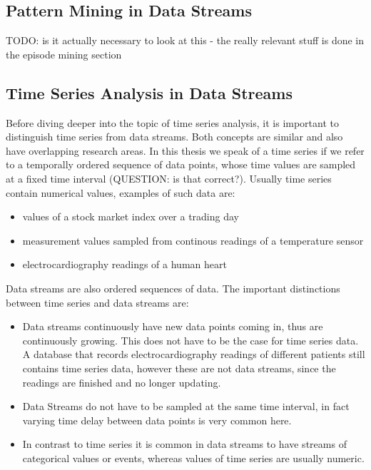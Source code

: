 \subsection{Pattern Mining in Data Streams}
\label{subsec_PatternMining}

TODO: is it actually necessary to look at this - the really relevant stuff is done in the episode mining section

\subsection{Time Series Analysis in Data Streams}
\label{subsec_timeSeriesAnalysis}
Before diving deeper into the topic of time series analysis, it is important to distinguish time series from data streams. Both concepts are similar and also have overlapping research areas. In this thesis we speak of a time series if we refer to a temporally ordered sequence of data points, whose time values are sampled at a fixed time interval (QUESTION: is that correct?). Usually time series contain numerical values, examples of such data are:

\begin{itemize}
	\item values of a stock market index over a trading day
	\item measurement values sampled from continous readings of a temperature sensor
	\item electrocardiography readings of a human heart
\end{itemize}

Data streams are also ordered sequences of data. The important distinctions between time series and data streams are: 

\begin{itemize}
	\item Data streams continuously have new data points coming in, thus are continuously growing. This does not have to be the case for time series data. A database that records electrocardiography readings of different patients still contains time series data, however these are not data streams, since the readings are finished and no longer updating.
	\item Data Streams do not have to be sampled at the same time interval, in fact varying time delay between data points is very common here.
	\item In contrast to time series it is common in data streams to have streams of categorical values or events, whereas values of time series are usually numeric.
\end{itemize}

